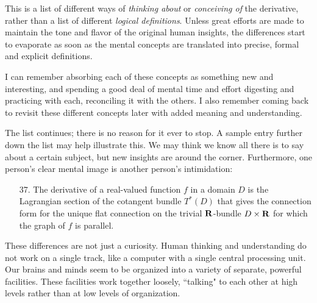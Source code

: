 This is a list of different
ways of {\it thinking about} or {\it conceiving of} the 
derivative,
rather than a list of different {\it logical definitions}. 
Unless great efforts are made to maintain the tone and 
flavor of
the original human insights, the differences start to 
evaporate as
soon as the mental concepts are translated into 
precise, formal and explicit definitions.

I can remember absorbing each of these concepts as 
something new and interesting, and spending a good deal of 
mental
time and effort digesting and practicing with each,
reconciling it with the others.  I also remember coming 
back to
revisit these different concepts later with added meaning 
and understanding.

The list continues; there is no reason for it ever to stop.
A sample entry further down the list may help illustrate 
this.  We may
think we know all there is to say about a certain subject,
but new insights are around the corner. Furthermore, one 
person's clear
mental image is another person's intimidation:
\begin{enumerate}
\item[37.]
The derivative of a real-valued function $f$ in a domain $D$
is the Lagrangian section of the cotangent bundle $T^*(D)$
that gives the connection form for the unique flat 
connection on the trivial
$\bold R$-bundle $D \times \bold R$ for which the graph of 
$f$ is parallel.
\end{enumerate}

These differences are not just a curiosity.  Human 
thinking and 
understanding do not work on a single track, like a 
computer with a 
single central processing unit.  Our brains and minds seem 
to be
organized into a variety of separate, powerful facilities.
These facilities work together loosely, ``talking" to each 
other at
high levels rather than at low levels of organization.


